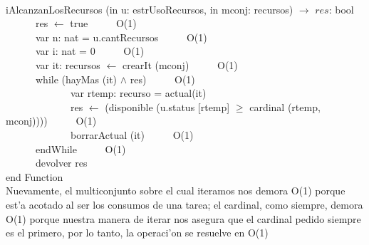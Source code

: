 \documentclass[a4paper,10pt]{article}
\begin{document}
\begin{algoritmo}
\caption{}\\
iAlcanzanLosRecursos (in u: estrUsoRecursos, in mconj: recursos) $\rightarrow$ $res$: bool \\
	\indent \ \ \ \ \ \  res $\gets$ true  \ \ \ \ \ O(1)\\
	\indent \ \ \ \ \ \  var n: nat = u.cantRecursos  \ \ \ \ \ O(1)\\
	\indent \ \ \ \ \ \  var i: nat = 0  \ \ \ \ \ O(1)\\  
	\indent \ \ \ \ \ \  var it: recursos $\gets$ crearIt (mconj)  \ \ \ \ \ O(1)\\ 
	\indent \ \ \ \ \ \  while (hayMas (it) $\wedge$ res)  \ \ \ \ \ O(1)\\
	\indent \ \ \ \ \ \ \ \ \ \ \ \ \ var rtemp: recurso = actual(it) \\	
	\indent \ \ \ \ \ \ \ \ \ \ \ \ \ res $\gets$ (disponible (u.status [rtemp] $\geq$ cardinal (rtemp, mconj)))) \ \ \ \ \ O(1) \\
	\indent \ \ \ \ \ \ \ \ \ \ \ \ \ borrarActual (it) \ \ \ \ \ O(1) \\
	\indent \ \ \ \ \ \  endWhile \ \ \ \ \ O(1)\\ 
	\indent \ \ \ \ \ \  devolver res    \\
   end Function \\

Nuevamente, el multiconjunto sobre el cual iteramos nos demora O(1) porque est'a acotado al ser los consumos de una tarea; el cardinal, como siempre, demora O(1) porque nuestra manera de iterar nos asegura que el cardinal pedido siempre es el primero, por lo tanto, la operaci'on se resuelve en O(1)
\end{algoritmo}
\end{document}
